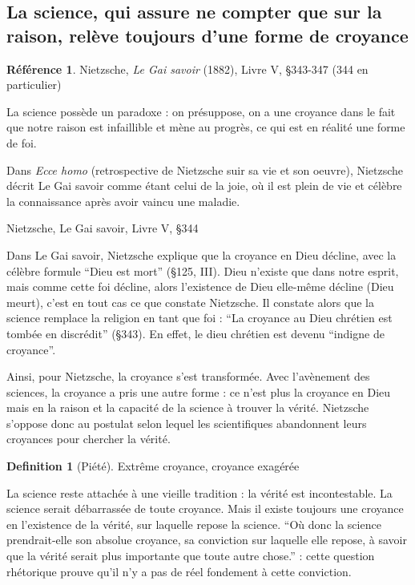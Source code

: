 \documentclass[french]{book}
\theoremstyle{definition}
\newtheorem*{dfn}{Definition}
\newtheorem*{refe}{Référence}
\begin{document}
\subsection{La science, qui assure ne compter que sur la raison, relève toujours d'une forme de croyance}

\begin{refe}
	Nietzsche, \textit{Le Gai savoir} (1882), Livre V, §343-347 (344 en particulier)
\end{refe}

La science possède un paradoxe : on présuppose, on a une croyance dans le fait que notre raison est infaillible et mène au progrès, ce qui est en réalité une forme de foi.

Dans \textit{Ecce homo} (retrospective de Nietzsche suir sa vie et son oeuvre), Nietzsche décrit Le Gai savoir comme étant celui de la joie, où il est plein de vie et célèbre la connaissance après avoir vaincu une maladie.

Nietzsche, Le Gai savoir, Livre V, §344

Dans Le Gai savoir, Nietzsche explique que la croyance en Dieu décline, avec la célèbre formule “Dieu est mort” (§125, III). Dieu n’existe que dans notre esprit, mais comme cette foi décline, alors l’existence de Dieu elle-même décline (Dieu meurt), c’est en tout cas ce que constate Nietzsche.
Il constate alors que la science remplace la religion en tant que foi : “La croyance au Dieu chrétien est tombée en discrédit” (§343). En effet, le dieu chrétien est devenu “indigne de croyance”.

Ainsi, pour Nietzsche, la croyance s’est transformée. Avec l’avènement des sciences, la croyance a pris une autre forme : ce n’est plus la croyance en Dieu mais en la raison et la capacité de la science à trouver la vérité. Nietzsche s’oppose donc au postulat selon lequel les scientifiques abandonnent leurs croyances pour chercher la vérité.

\begin{dfn}[Piété]
Extrême croyance, croyance exagérée
\end{dfn}


La science reste attachée à une vieille tradition : la vérité est incontestable. La science serait débarrassée de toute croyance.
Mais il existe toujours une croyance en l’existence de la vérité, sur laquelle repose la science.
“Où donc la science prendrait-elle son absolue croyance, sa conviction sur laquelle elle repose, à savoir que la vérité serait plus importante que toute autre chose.” : cette question rhétorique prouve qu’il n’y a pas de réel fondement à cette conviction.
\end{document}
